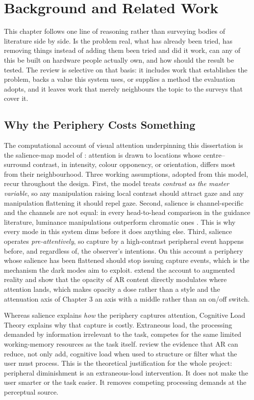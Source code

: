 \chapter{Background and Related Work}

This chapter follows one line of reasoning rather than surveying bodies of literature side by side.
Is the problem real, what has already been tried, has removing things instead of adding them been
tried and did it work, can any of this be built on hardware people actually own, and how should the
result be tested. The review is selective on that basis: it includes work that establishes the
problem, backs a value this system uses, or supplies a method the evaluation adopts, and it leaves
work that merely neighbours the topic to the surveys that cover it.

\section{Why the Periphery Costs Something}

The computational account of visual attention underpinning this dissertation is the salience-map
model of \citet{itti1998}: attention is drawn to locations whose centre--surround contrast, in
intensity, colour opponency, or orientation, differs most from their neighbourhood. Three working
assumptions, adopted from this model, recur throughout the design. First, the model treats
\textit{contrast as the master variable}, so any
manipulation raising local contrast should attract gaze and any manipulation flattening it should
repel gaze.
Second, salience is channel-specific and the channels are not equal: in every head-to-head comparison
in the guidance literature, luminance manipulations outperform chromatic ones
\citep{bailey2009,grogorick2017}. This is why every mode in this system dims before it does anything
else. Third, salience operates \textit{pre-attentively}, so capture by a high-contrast peripheral
event happens before, and regardless of, the observer's intentions. On this account a periphery
whose salience has been flattened should stop issuing capture events, which is the mechanism the
dark modes aim to exploit.
\citet{duan2022} extend the account to augmented reality and show that the opacity of AR content
directly modulates where attention lands, which makes opacity a dose rather than a style and the
attenuation axis of Chapter 3 an axis with a middle rather than an on/off switch.

Whereas salience explains \textit{how} the periphery captures attention, Cognitive Load Theory explains
why that capture is costly. Extraneous load, the processing demanded by information irrelevant to the
task, competes for the same limited working-memory resources as the task itself. \citet{buchner2022}
review the evidence that AR can reduce, not only add, cognitive load when used to structure or filter
what the user must process. This is the theoretical justification for the whole project: peripheral
diminishment is an extraneous-load intervention. It does not make the user smarter or the task
easier. It removes competing processing demands at the perceptual source.

